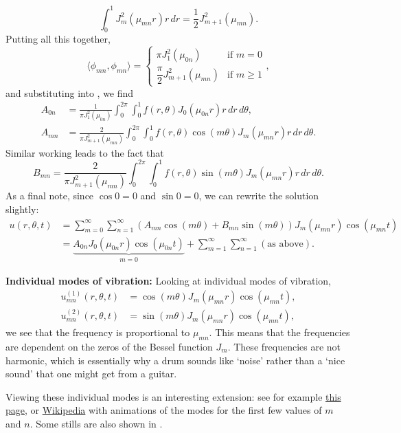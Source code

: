 \begin{enumerate}
	\[
	\int_0^1 J_m^2(\mu_{mn}r) r \,dr = \frac12 J_{m+1}^2(\mu_{mn}).
	\]
	Putting all this together,
	\begin{equation}\label{eq:wave2dproj2}
		\langle \phi_{mn}, \phi_{mn}\rangle = \begin{cases}\pi J_1^2(\mu_{0n}) & \text{if } m=0 \\[1em] \dfrac{\pi}{2} J_{m+1}^2(\mu_{mn}) & \text{if } m\geq 1 \end{cases},
	\end{equation}
	and substituting  into , we find
	\begin{align*}
		A_{0n} &= \frac{1}{\pi J_1^2(\mu_{0n})} \int_0^{2\pi} \int_0^1 f(r,\theta) J_0(\mu_{0n}r) r \,dr\,d\theta, \\
		A_{mn} &= \frac{2}{\pi J_{m+1}^2(\mu_{mn})} \int_0^{2\pi} \int_0^1 f(r,\theta) \cos(m\theta) J_m(\mu_{mn}r) r \,dr\,d\theta.
	\end{align*}
	Similar working leads to the fact that
	\[
	B_{mn} = \frac{2}{\pi J_{m+1}^2(\mu_{mn})} \int_0^{2\pi} \int_0^1 f(r,\theta) \sin(m\theta) J_m(\mu_{mn}r) r \,dr\,d\theta.
	\]
	As a final note, since $\cos{0}=0$ and $\sin{0}=0$, we can rewrite the solution slightly:
	\begin{align*}
		u(r,\theta,t) &= \sum_{m=0}^{\infty} \sum_{n=1}^{\infty} \left(A_{mn}\cos(m\theta) + B_{mn}\sin(m\theta)\right) J_m(\mu_{mn}r) \cos(\mu_{mn}t) \\
		&= \underbrace{A_{0n}J_0(\mu_{0n}r) \cos(\mu_{0n}t)}_{m=0} + \sum_{m=1}^{\infty} \sum_{n=1}^{\infty} (\text{as above}).
	\end{align*}
	
	\textbf{Individual modes of vibration:} Looking at individual modes of vibration,
	\begin{align*}
		u_{mn}^{(1)}(r,\theta,t) &= \cos(m\theta) J_m(\mu_{mn}r) \cos(\mu_{mn}t), \\
		u_{mn}^{(2)}(r,\theta,t) &= \sin(m\theta) J_m(\mu_{mn}r) \cos(\mu_{mn}t),
	\end{align*}
	we see that the frequency is proportional to $\mu_{mn}$. This means that the frequencies are dependent on the zeros of the Bessel function $J_m$. These frequencies are not harmonic, which is essentially why a drum sounds like `noise' rather than a `nice sound' that one might get from a guitar.
	
	Viewing these individual modes is an interesting extension: see for example \href{https://www.acs.psu.edu/drussell/demos/membranecircle/circle.html}{this page}, or \href{https://en.wikipedia.org/wiki/Vibrations_of_a_circular_membrane#Animations_of_several_vibration_modes}{Wikipedia} with animations of the modes for the first few values of $m$ and $n$. Some stills are also shown in .
	

\end{enumerate}
